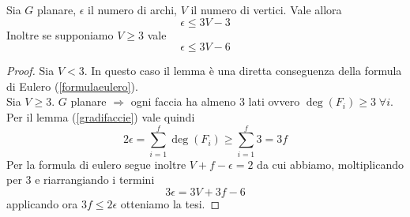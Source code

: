 \begin{lemma}
    Sia \(G\) planare, \(\epsilon\) il numero di archi, \(V\) il numero di vertici. Vale allora
    \begin{equation}
        \epsilon \leq 3V - 3
    \end{equation}
    Inoltre se supponiamo \(V \geq 3\) vale
    \begin{equation}
        \epsilon \leq 3V - 6
    \end{equation}
\end{lemma}
\begin{proof}
    Sia \(V<3\). In questo caso il lemma è una diretta conseguenza della formula di Eulero (\ref{formulaeulero}). \\
    Sia \(V\geq 3\). \(G\) planare \(\Rightarrow\) ogni faccia ha almeno 3 lati ovvero \(\deg(F_i) \geq 3\; \forall i\). Per il lemma (\ref{gradifaccie}) vale quindi
    \begin{equation}
        2\epsilon = \sum_{i=1}^f \deg(F_i) \geq \sum_{i=1}^f 3 = 3f
    \end{equation}
    Per la formula di eulero segue inoltre \(V+f-\epsilon = 2\) da cui abbiamo, moltiplicando per 3 e riarrangiando i termini
    \begin{equation}
        3\epsilon = 3V + 3f - 6
    \end{equation}
    applicando ora \(3f\leq 2 \epsilon\) otteniamo la tesi.
\end{proof}
